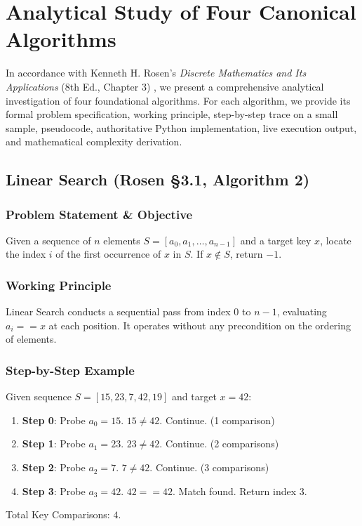 \chapter{Analytical Study of Four Canonical Algorithms}
\label{chap:analytical_study}

In accordance with Kenneth H. Rosen's \emph{Discrete Mathematics and Its Applications} (8th Ed., Chapter 3) \cite{rosen2019discrete}, we present a comprehensive analytical investigation of four foundational algorithms. For each algorithm, we provide its formal problem specification, working principle, step-by-step trace on a small sample, pseudocode, authoritative Python implementation, live execution output, and mathematical complexity derivation.

\section{Linear Search (Rosen §3.1, Algorithm 2)}
\label{sec:linear_search}

\subsection{Problem Statement \& Objective}
Given a sequence of $n$ elements $S = [a_0, a_1, \dots, a_{n-1}]$ and a target key $x$, locate the index $i$ of the first occurrence of $x$ in $S$. If $x \notin S$, return $-1$.

\subsection{Working Principle}
Linear Search conducts a sequential pass from index $0$ to $n-1$, evaluating $a_i == x$ at each position. It operates without any precondition on the ordering of elements.

\subsection{Step-by-Step Example}
Given sequence $S = [15, 23, 7, 42, 19]$ and target $x = 42$:
\begin{enumerate}
    \item \textbf{Step 0}: Probe $a_0 = 15$. $15 \neq 42$. Continue. (1 comparison)
    \item \textbf{Step 1}: Probe $a_1 = 23$. $23 \neq 42$. Continue. (2 comparisons)
    \item \textbf{Step 2}: Probe $a_2 = 7$. $7 \neq 42$. Continue. (3 comparisons)
    \item \textbf{Step 3}: Probe $a_3 = 42$. $42 == 42$. Match found. Return index $3$.
\end{enumerate}
Total Key Comparisons: $4$.

